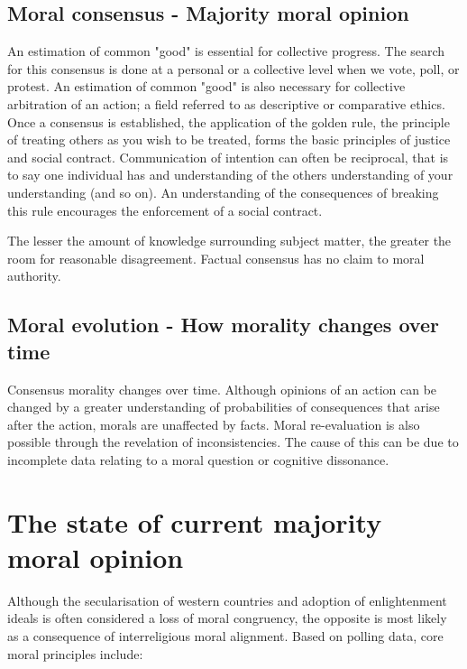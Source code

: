 \subsection{Moral consensus - Majority moral opinion}
An estimation of common "good" is essential for collective progress.
The search for this consensus is done at a personal or a collective level when we vote, poll, or protest. 
An estimation of common "good" is also necessary for collective arbitration of an action; a field referred to as descriptive or comparative ethics.
Once a consensus is established, the application of the golden rule, the principle of treating others as you wish to be treated, forms the basic principles of justice and social contract.
Communication of intention can often be reciprocal, that is to say one individual has and understanding of the others understanding of your understanding (and so on).
An understanding of the consequences of breaking this rule encourages the enforcement of a social contract.

The lesser the amount of knowledge surrounding subject matter, the greater the room for reasonable disagreement. 
Factual consensus has no claim to moral authority.

\subsection{Moral evolution - How morality changes over time}
Consensus morality changes over time.
Although opinions of an action can be changed by a greater understanding of probabilities of consequences that arise after the action, morals are unaffected by facts.
Moral re-evaluation is also possible through the revelation of inconsistencies.
The cause of this can be due to incomplete data relating to a moral question or cognitive dissonance.

\section{The state of current majority moral opinion}
Although the secularisation of western countries and adoption of enlightenment ideals is often considered a loss of moral congruency, the opposite is most likely as a consequence of interreligious moral alignment.
Based on polling data, core moral principles include:

